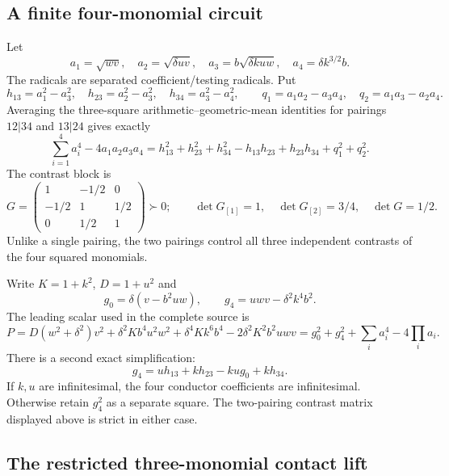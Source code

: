 \subsection{A finite four-monomial circuit}

\label{component:p58894e12bcef}

Let
\[
a_1=\sqrt{wv},\quad a_2=\sqrt{\delta uv},\quad
a_3=b\sqrt{\delta kuw},\quad a_4=\delta k^{3/2}b.
\]
The radicals are separated coefficient/testing radicals. Put
\[
h_{13}=a_1^2-a_3^2,\quad h_{23}=a_2^2-a_3^2,\quad
h_{34}=a_3^2-a_4^2,
\qquad q_1=a_1a_2-a_3a_4,\quad q_2=a_1a_3-a_2a_4.
\]
Averaging the three-square arithmetic--geometric-mean identities for
pairings $12|34$ and $13|24$ gives exactly
\begin{equation}
\sum_{i=1}^4a_i^4-4a_1a_2a_3a_4
=h_{13}^2+h_{23}^2+h_{34}^2-h_{13}h_{23}+h_{23}h_{34}
 +q_1^2+q_2^2.\label{p58894e12bcef:eq:compact-circuit}
\end{equation}
The contrast block is
\[
G=\begin{pmatrix}1&-1/2&0\\-1/2&1&1/2\\0&1/2&1\end{pmatrix}\succ0;
\qquad \det G_{[1]}=1,\quad\det G_{[2]}=3/4,\quad\det G=1/2.
\]
Unlike a single pairing, the two pairings control all three independent
contrasts of the four squared monomials.

Write $K=1+k^2$, $D=1+u^2$ and
\[
g_0=\delta(v-b^2uw),\qquad g_4=uwv-\delta^2k^4b^2.
\]
The leading scalar used in the complete source is
\[
P=D(w^2+\delta^2)v^2+\delta^2Kb^4u^2w^2+
\delta^4Kk^6b^4-2\delta^2K^2b^2uwv
=g_0^2+g_4^2+\sum_i a_i^4-4\prod_i a_i.
\]
There is a second exact simplification:
\begin{equation}
g_4=u h_{13}+k h_{23}-ku g_0+k h_{34}.\label{p58894e12bcef:eq:g4-conductor}
\end{equation}
If $k,u$ are infinitesimal, the four conductor coefficients
are infinitesimal. Otherwise retain $g_4^2$ as a separate square.
The two-pairing contrast matrix displayed above is strict in either case.


\subsection{The restricted three-monomial contact lift}

\label{component:p466b31015532}

\label{p466b31015532:sec:three-circuit}

